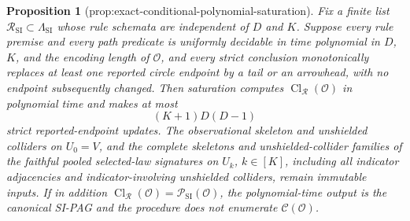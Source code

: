 \documentclass{article}
\newtheorem{proposition}{Proposition}
\begin{document}
\begin{proposition}[prop:exact-conditional-polynomial-saturation]\label{prop:exact-conditional-polynomial-saturation}
Fix a finite list \(\mathcal R_{\mathrm{SI}}\subset\Lambda_{\mathrm{SI}}\) whose rule schemata are independent of \(D\) and \(K\). Suppose every rule premise and every path predicate is uniformly decidable in time polynomial in \(D\), \(K\), and the encoding length of \(\mathcal O\), and every strict conclusion monotonically replaces at least one reported circle endpoint by a tail or an arrowhead, with no endpoint subsequently changed. Then saturation computes \(\operatorname{Cl}_{\mathcal R}(\mathcal O)\) in polynomial time and makes at most
\[
 (K+1)D(D-1)
\]
strict reported-endpoint updates. The observational skeleton and unshielded colliders on \(U_0=V\), and the complete skeletons and unshielded-collider families of the faithful pooled selected-law signatures on \(U_k\), \(k\in[K]\), including all indicator adjacencies and indicator-involving unshielded colliders, remain immutable inputs. If in addition \(\operatorname{Cl}_{\mathcal R}(\mathcal O)=\mathcal P_{\mathrm{SI}}(\mathcal O)\), the polynomial-time output is the canonical SI-PAG and the procedure does not enumerate \(\mathcal C(\mathcal O)\).
\end{proposition}
\end{document}
